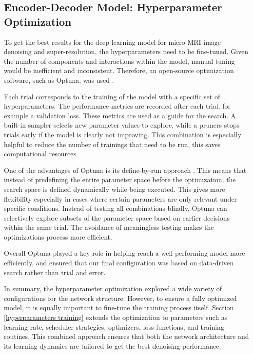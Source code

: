 \documentclass[twocolumn]{article}
\begin{document}
\subsection{Encoder-Decoder Model: Hyperparameter Optimization}
To get the best results for the deep learning model for micro MRI image denoising and super-resolution, the hyperparameters need to be fine-tuned. 
Given the number of components and interactions within the model, manual tuning would be inefficient and inconsistent. 
Therefore, an open-source optimization software, such as Optuna, was used \cite{datacamp_optuna}. 

Each trial corresponds to the training of the model with a specific set of hyperparameters. 
The performance metrics are recorded after each trial, for example a validation loss. These metrics are used as a guide for the search. 
A built-in sampler selects new parameter values to explore, while a pruners stops trials early if the model is clearly not improving. 
This combination is especially helpful to reduce the number of trainings that need to be run, this saves computational resources. 

One of the advantages of Optuna is its define-by-run approach \cite{10.1145/3292500.3330701}. 
This means that instead of predefining the entire parameter space before the optimization, the search space is defined dynamically while being executed. 
This gives more flexibility especially in cases where certain parameters are only relevant under specific conditions. 
Instead of testing all combinations blindly, Optuna can selectively explore subsets of the parameter space based on earlier decisions within the same trial. 
The avoidance of meaningless testing makes the optimizations process  more efficient. 

Overall Optuna played a key role in helping reach a well-performing model more efficiently, and ensured that our final configuration was based on data-driven search rather than trial and error.

In summary, the hyperparameter optimization explored a wide variety of configurations for the network structure. 
However, to ensure a fully optimized model, it is equally important to fine-tune the training process itself.
Section \ref{hyperparameters training} extends the optimization to parameters such as learning rate, scheduler strategies, optimizers, loss functions, and training routines. 
This combined approach ensures that both the network architecture and its learning dynamics are tailored to get the best denoising performance. 
\end{document}
